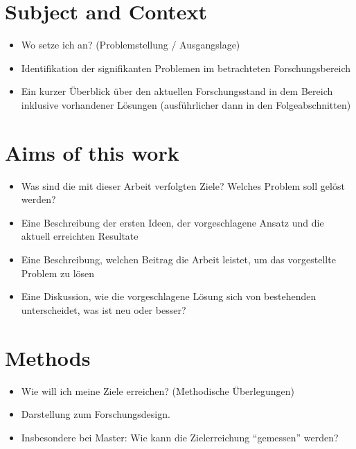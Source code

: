 
\section{Subject and Context}
\begin{itemize}
	\item Wo setze ich an? (Problemstellung / Ausgangslage)
	\item Identifikation der signifikanten Problemen im betrachteten Forschungsbereich
	\item Ein kurzer Überblick über den aktuellen Forschungsstand in dem Bereich inklusive vorhandener Lösungen (ausführlicher dann in den Folgeabschnitten)
\end{itemize}

\section{Aims of this work}
\begin{itemize}
	\item Was sind die mit dieser Arbeit verfolgten Ziele? Welches Problem soll gelöst werden?
	\item Eine Beschreibung der ersten Ideen, der vorgeschlagene Ansatz und die aktuell erreichten Resultate
	\item Eine Beschreibung, welchen Beitrag die Arbeit leistet, um das vorgestellte Problem zu lösen
	\item Eine Diskussion, wie die vorgeschlagene Lösung sich von bestehenden unterscheidet, was ist neu oder besser?
\end{itemize}

\section{Methods}
\begin{itemize}
	\item Wie will ich meine Ziele erreichen? (Methodische Überlegungen)
	\item Darstellung zum Forschungsdesign.
	\item Insbesondere bei Master: Wie kann die Zielerreichung ``gemessen'' werden?
\end{itemize}

